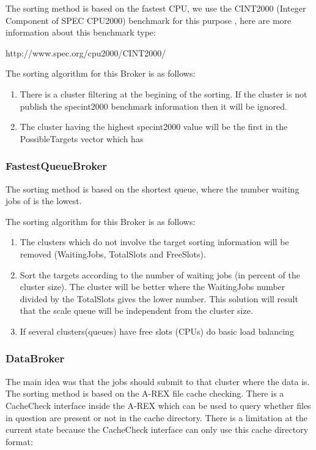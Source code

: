 \documentclass{book}
\begin{document}
The sorting method is based on the fastest CPU, we use the CINT2000 (Integer Component of SPEC CPU2000) benchmark for this purpose , here are more information about this benchmark type: 

http://www.spec.org/cpu2000/CINT2000/

The sorting algorithm for this Broker is as follows:

\begin{enumerate}
\item{There is a cluster filtering at the begining of the sorting. If the cluster is not publish the specint2000 benchmark information then it will be ignored.}
\item{The cluster having the highest specint2000 value will be the first in the PossibleTargets vector which has }
\end{enumerate}

\subsubsection{FastestQueueBroker}

The sorting method is based on the shortest queue, where the number waiting jobs  of  is the lowest. 

The sorting algorithm for this Broker is as follows:

\begin{enumerate}
\item{The clusters which do not involve the target sorting information will be removed  (WaitingJobs, TotalSlots and FreeSlots).}
\item{Sort the targets according to the number of waiting jobs (in percent of the cluster size). The cluster will be better where the WaitingJobs number divided by the TotalSlots gives the lower number. This solution will result that the scale queue will be independent from the cluster size.}
\item{If several clusters(queues) have free slots (CPUs) do basic load balancing}
\end{enumerate}

\subsubsection{DataBroker}

The main idea was that the jobs should submit to that cluster where the data is. The sorting method is based on the A-REX file cache checking. There is a CacheCheck interface inside the A-REX which can be used to query whether files in question are present or not in the cache directory. There is a limitation at the current state because the CacheCheck interface can only use this cache directory format: 
\end{document}
